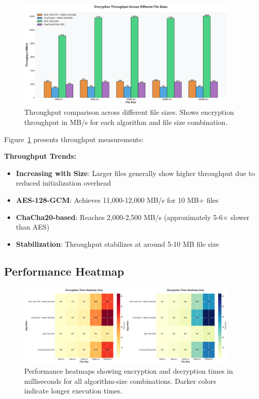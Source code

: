 \documentclass[12pt,a4paper]{article}
\begin{document}
\begin{figure}[h]
\centering
\includegraphics[width=0.95\textwidth]{throughput_scaling.png}
\caption{Throughput comparison across different file sizes. Shows encryption throughput in MB/s for each algorithm and file size combination.}
\label{fig:throughput_scaling}
\end{figure}

Figure~\ref{fig:throughput_scaling} presents throughput measurements:

\textbf{Throughput Trends:}
\begin{itemize}
    \item \textbf{Increasing with Size}: Larger files generally show higher throughput due to reduced initialization overhead
    \item \textbf{AES-128-GCM}: Achieves 11,000-12,000 MB/s for 10 MB+ files
    \item \textbf{ChaCha20-based}: Reaches 2,000-2,500 MB/s (approximately 5-6× slower than AES)
    \item \textbf{Stabilization}: Throughput stabilizes at around 5-10 MB file size
\end{itemize}

\subsection{Performance Heatmap}

\begin{figure}[h]
\centering
\includegraphics[width=0.95\textwidth]{performance_heatmap.png}
\caption{Performance heatmaps showing encryption and decryption times in milliseconds for all algorithm-size combinations. Darker colors indicate longer execution times.}
\label{fig:heatmap}
\end{figure}
\end{document}
